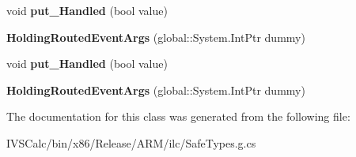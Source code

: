 \begin{DoxyCompactItemize}
void {\bfseries put\+\_\+\+Handled} (bool value)
\item 
\mbox{\label{class_windows_1_1_u_i_1_1_xaml_1_1_input_1_1_holding_routed_event_args_a56bcee1650c157c5ae0aad530d188d87}} 
{\bfseries Holding\+Routed\+Event\+Args} (global\+::\+System.\+Int\+Ptr dummy)
\item 
\mbox{\label{class_windows_1_1_u_i_1_1_xaml_1_1_input_1_1_holding_routed_event_args_a54c9b9e77ad763b94bc8b86c8d171f7d}} 
void {\bfseries put\+\_\+\+Handled} (bool value)
\item 
\mbox{\label{class_windows_1_1_u_i_1_1_xaml_1_1_input_1_1_holding_routed_event_args_a56bcee1650c157c5ae0aad530d188d87}} 
{\bfseries Holding\+Routed\+Event\+Args} (global\+::\+System.\+Int\+Ptr dummy)
\end{DoxyCompactItemize}


The documentation for this class was generated from the following file\+:\begin{DoxyCompactItemize}
\item 
I\+V\+S\+Calc/bin/x86/\+Release/\+A\+R\+M/ilc/Safe\+Types.\+g.\+cs\end{DoxyCompactItemize}
